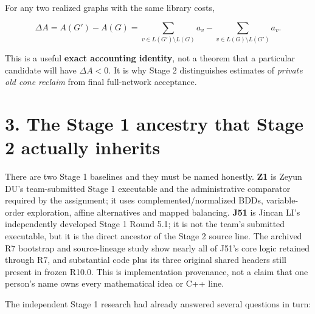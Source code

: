 \documentclass[a4paper,10pt]{article}
\theoremstyle{definition}
\theoremstyle{remark}
\begin{document}
For any two realized graphs with the same library costs,

\[
\Delta A=A(G')-A(G)
=\sum_{v\in L(G')\setminus L(G)}a_v
 -\sum_{v\in L(G)\setminus L(G')}a_v.
\]

This is a useful \textbf{exact accounting identity}, not a theorem that a particular candidate will have \(\Delta A<0\). It is why Stage 2 distinguishes estimates of \emph{private old cone reclaim} from final full-network acceptance.

\section{3. The Stage 1 ancestry that Stage 2 actually inherits}\label{the-stage-1-ancestry-that-stage-2-actually-inherits}

There are two Stage 1 baselines and they must be named honestly. \textbf{Z1} is Zeyun DU's team-submitted Stage 1 executable and the administrative comparator required by the assignment; it uses complemented/normalized BDDs, variable-order exploration, affine alternatives and mapped balancing. \textbf{J51} is Jincan LI's independently developed Stage 1 Round 5.1; it is not the team's submitted executable, but it is the direct ancestor of the Stage 2 source line. The archived R7 bootstrap and source-lineage study show nearly all of J51's core logic retained through R7, and substantial code plus its three original shared headers still present in frozen R10.0. This is implementation provenance, not a claim that one person's name owns every mathematical idea or C++ line.

The independent Stage 1 research had already answered several questions in turn:
\end{document}
